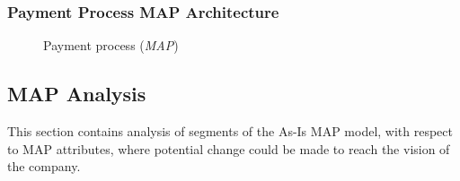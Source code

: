 \subsubsection{Payment Process MAP Architecture}
\label{sec:phone_map}
\begin{center}
	\begin{figure}[H]
		\centering
		\setlength\fboxsep{7pt}
		\setlength\fboxrule{0.5pt}
		\caption{Payment process (\emph{MAP})}
		\label{fig:map_pay}
	\end{figure}
\end{center}
%
\subsection{MAP Analysis}
\label{sec:map_analysis}
This section contains analysis of segments of the As-Is MAP model, with respect to MAP attributes, where potential change could be made to reach the vision of the company.
